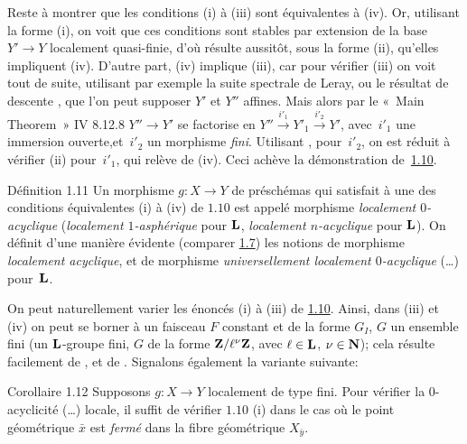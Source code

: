 \documentclass[10pt]{../fichiers-configuration-latex/smfart}
\begin{document}
Reste à montrer que les conditions (i) à (iii) sont équivalentes à
(iv). Or, utilisant la forme (i), on voit que ces conditions sont
stables par extension de la base $Y'\rightarrow Y$ localement
quasi-finie, d'où résulte aussitôt, sous la forme (ii), qu'elles
impliquent (iv). D'autre part, (iv) implique (iii), car pour vérifier
(iii) on voit tout de suite, utilisant par exemple la suite spectrale
de Leray, ou le résultat de descente , que l'on peut supposer
$Y'$ et $Y''$ affines. Mais alors par le « Main Theorem »  \EGA IV
8.12.8 $Y''\rightarrow Y'$ se factorise en
$Y''\xrightarrow{i'_1}Y'_1\xrightarrow{i'_2}Y'$, avec~$i'_1$
une immersion ouverte,\pageoriginale et~$i'_2$ un morphisme
\emph{fini}. Utilisant ,  pour~$i'_2$, on est réduit à
vérifier (ii) pour~$i'_1$, qui relève de (iv). Ceci achève la
démonstration de~\hyperref[XV.prop1.10]{1.10}.

\begin{enonce*}{Définition 1.11}
Un morphisme $g:X\rightarrow Y$ de préschémas qui satisfait à une des
conditions équivalentes {\rm(i)} à {\rm(iv)} de $1.10$ est appelé
morphisme \emph{localement $0$-acyclique} (\resp \emph{localement
$1$-asphérique} pour $\mathbf{L}$, \resp \emph{localement
$n$-acyclique} pour $\mathbf{L}$). On définit d'une manière évidente
(comparer \hyperref[XV.def1.7]{1.7}) les notions de morphisme \emph{localement acyclique},
et de morphisme \emph{universellement localement $0$-acyclique}
(\resp\ldots) pour~$\mathbf{L}$.
\end{enonce*}

On peut naturellement varier les énoncés (i) à (iii) de \hyperref[XV.prop1.10]{1.10}. Ainsi,
dans (iii) et (iv) on peut se borner à un faisceau $F$ constant et de
la forme $G_{I}$,
 $G$ un ensemble fini (\resp un $\mathbf{L}$-groupe
fini, \resp $G$ de la forme $\mathbf{Z}/\ell^{\nu}\mathbf{Z}$, avec
$\ell\in\mathbf{L}$, $\nu\in \mathbf{N}$); cela résulte facilement de
,  et de .
Signalons également la variante suivante:

\begin{enonce*}{Corollaire 1.12}
Supposons $g:X\rightarrow Y$ localement de type fini. Pour vérifier la
$0$-acyclicité (\resp\ldots) locale, il suffit de vérifier $1.10$
{\rm(i)} dans le cas où le point géométrique $\bar{x}$ est
\emph{fermé} dans la fibre géométrique $X_{\bar{y}}$.
\end{enonce*}
\end{document}
